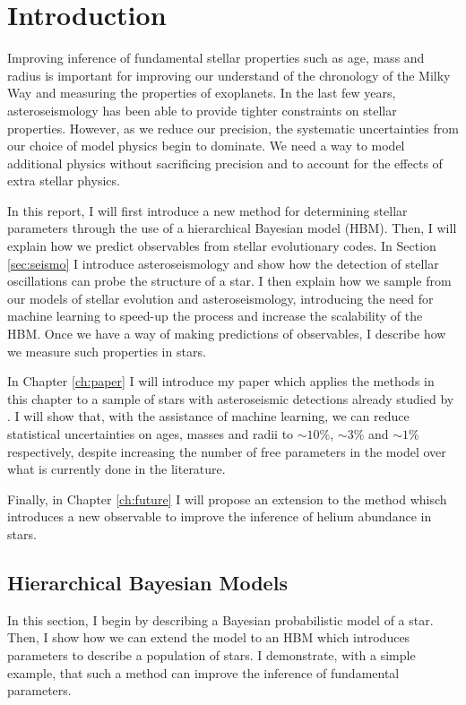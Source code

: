 \chapter{Introduction}

Improving inference of fundamental stellar properties such as age, mass and radius is important for improving our understand of the chronology of the Milky Way and measuring the properties of exoplanets. In the last few years, asteroseismology has been able to provide tighter constraints on stellar properties. However, as we reduce our precision, the systematic uncertainties from our choice of model physics begin to dominate. We need a way to model additional physics without sacrificing precision and to account for the effects of extra stellar physics.

In this report, I will first introduce a new method for determining stellar parameters through the use of a hierarchical Bayesian model (HBM). Then, I will explain how we predict observables from stellar evolutionary codes. In Section \ref{sec:seismo} I introduce asteroseismology and show how the detection of stellar oscillations can probe the structure of a star. I then explain how we sample from our models of stellar evolution and asteroseismology, introducing the need for machine learning to speed-up the process and increase the scalability of the HBM. Once we have a way of making predictions of observables, I describe how we measure such properties in stars.

In Chapter \ref{ch:paper} I will introduce my paper which applies the methods in this chapter to a sample of stars with asteroseismic detections already studied by \citet{Serenelli.Johnson.ea2017}. I will show that, with the assistance of machine learning, we can reduce statistical uncertainties on ages, masses and radii to $\sim 10\%$, $\sim 3\%$ and $\sim 1\%$ respectively, despite increasing the number of free parameters in the model over what is currently done in the literature.

Finally, in Chapter \ref{ch:future} I will propose an extension to the method whisch introduces a new observable to improve the inference of helium abundance in stars.

\section{Hierarchical Bayesian Models}\label{sec:hbm}

In this section, I begin by describing a Bayesian probabilistic model of a star. Then, I show how we can extend the model to an HBM which introduces parameters to describe a population of stars. I demonstrate, with a simple example, that such a method can improve the inference of fundamental parameters.


